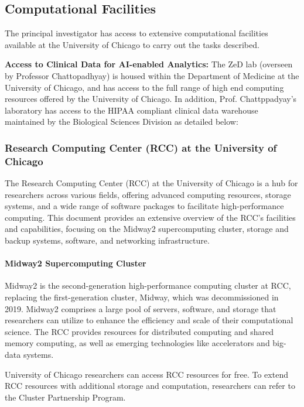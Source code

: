 \subsection*{Computational Facilities}


The principal investigator has access to extensive computational facilities available at the University of Chicago to carry out the tasks described.

\textbf{Access to Clinical Data for AI-enabled Analytics:} The ZeD lab (overseen by Professor Chattopadhyay) is housed within the Department of Medicine at the University of Chicago, and has access to the full range of high end computing resources offered by the University of Chicago. In addition, Prof. Chattppadyay's laboratory has access to the HIPAA compliant clinical data warehouse maintained by the Biological Sciences Division as detailed below:







\subsubsection*{Research Computing Center (RCC) at the University of Chicago}


The Research Computing Center (RCC) at the University of Chicago is a hub for researchers across various fields, offering advanced computing resources, storage systems, and a wide range of software packages to facilitate high-performance computing. This document provides an extensive overview of the RCC's facilities and capabilities, focusing on the Midway2 supercomputing cluster, storage and backup systems, software, and networking infrastructure.

\paragraph*{Midway2 Supercomputing Cluster}

Midway2 is the second-generation high-performance computing cluster at RCC, replacing the first-generation cluster, Midway, which was decommissioned in 2019. Midway2 comprises a large pool of servers, software, and storage that researchers can utilize to enhance the efficiency and scale of their computational science. The RCC provides resources for distributed computing and shared memory computing, as well as emerging technologies like accelerators and big-data systems.

University of Chicago researchers can access RCC resources for free. To extend RCC resources with additional storage and computation, researchers can refer to the Cluster Partnership Program.

